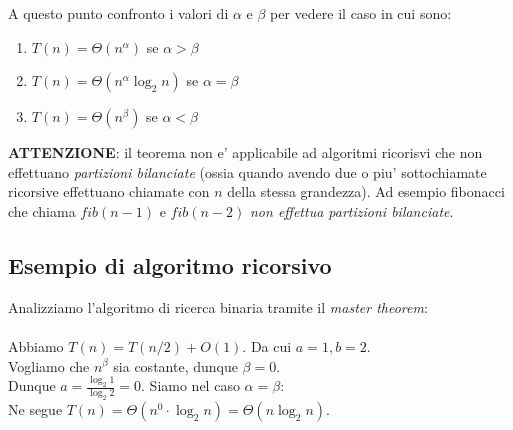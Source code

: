 \documentclass{article}
\begin{document}
A questo punto confronto i valori di $\alpha$ e $\beta$ per vedere il caso in cui sono:

\begin{enumerate}
  \item $T(n) = \Theta(n^{\alpha})$ se $\alpha > \beta$
  \item $T(n) = \Theta(n^{\alpha} \log_2 n)$ se $\alpha = \beta$
  \item $T(n) = \Theta(n^{\beta})$ se $\alpha < \beta$
\end{enumerate}

\textbf{ATTENZIONE}: il teorema non e' applicabile ad algoritmi ricorisvi che
non effettuano \emph{partizioni bilanciate} (ossia quando avendo due o piu' sottochiamate
ricorsive effettuano chiamate con $n$ della stessa grandezza). Ad esempio fibonacci
che chiama $fib(n-1)$ e $fib(n-2)$ \emph{non effettua partizioni bilanciate}.

\subsection{Esempio di algoritmo ricorsivo}

Analizziamo l'algoritmo di ricerca binaria tramite il \emph{master theorem}: \\ \\
Abbiamo $T(n) = T(n/2) + O(1)$. Da cui $a = 1, b = 2$. \\
Vogliamo che $n^\beta$ sia costante, dunque $\beta = 0$. \\
Dunque $a = \frac{\log_2 1}{\log_2 2} = 0$. Siamo nel caso $\alpha = \beta$: \\
Ne segue $T(n) = \Theta(n^0 \cdot \log_2 n) = \Theta(n \log_2 n)$.
\end{document}
